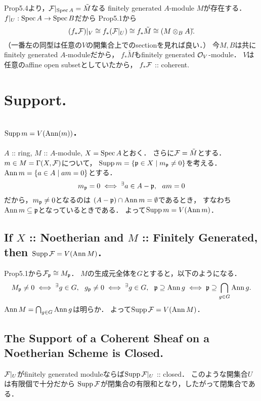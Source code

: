 \documentclass[a4paper]{jsarticle}
\begin{document}
    Prop5.4より，$\mathcal{F}|_{\operatorname{Spec} A}=\tilde{M}$なる
    finitely generated $A$-module $M$が存在する．
    $f|_{U}: \operatorname{Spec} A \to \operatorname{Spec} B$だから
    Prop5.1から
    \[ (f_* \mathcal{F})|_V \cong f_* (\mathcal{F}|_U) \cong f_* \tilde{M} \cong (M \otimes_{B} A) \check{}. \]
    （一番左の同型は任意の$V$の開集合上でのsectionを見れば良い．）
    今$M,B$は共にfinitely generated $A$-moduleだから，
    $f_* \tilde{M}$もfinitely generated $\mathcal{O}_V$-module．
    $V$は任意のaffine open subsetとしていたから，
    $f_* \mathcal{F}$ :: coherent.

\section{Support.} %
    \subsection{$\operatorname{Supp} m=V(\operatorname{Ann}(m))$.}
    $A$ :: ring, $M$ :: $A$-module, $X=\operatorname{Spec} A$とおく．
    さらに$\mathcal{F}=\tilde{M}$とする．
    $m \in M=\Gamma(X,\mathcal{F})$について，
    $\operatorname{Supp} m=\{ \mathfrak{p} \in X \mid m_{\mathfrak{p}} \neq 0 \}$を考える．
    $\operatorname{Ann} m=\{a \in A \mid am=0 \}$とする．
    \[ m_{\mathfrak{p}}=0 \iff {}^{\exists} a \in A-\mathfrak{p},~~ am=0 \]
    だから，$m_{\mathfrak{p}} \neq 0$となるのは
    $(A-\mathfrak{p}) \cap \operatorname{Ann} m=\emptyset$であるとき，
    すなわち$\operatorname{Ann} m \subseteq \mathfrak{p}$となっているときである．
    よって$\operatorname{Supp} m=V(\operatorname{Ann} m)$．

    \subsection{If $X$ :: Noetherian and $M$ :: Finitely Generated, then $\operatorname{Supp} \mathcal{F}=V(\operatorname{Ann} M)$.}
    Prop5.1から$\mathcal{F}_{\mathfrak{p}} \cong M_{\mathfrak{p}}$．
    $M$の生成元全体を$G$とすると，以下のようになる．
    \[
        M_{\mathfrak{p}} \neq 0
        \iff {}^{\exists} g \in G,~~ g_{\mathfrak{p}} \neq 0
        \iff {}^{\exists} g \in G,~~ \mathfrak{p} \supseteq \operatorname{Ann} g
        \iff \mathfrak{p} \supseteq \bigcap_{g \in G} \operatorname{Ann} g.
    \]
    $\operatorname{Ann} M=\bigcap_{g \in G} \operatorname{Ann} g$は明らか．
    よって$\operatorname{Supp} \mathcal{F}=V(\operatorname{Ann} M)$．

    \subsection{The Support of a Coherent Sheaf on a Noetherian Scheme is Closed.}
    $\mathcal{F}|_{U}$がfinitely generated moduleならば$\operatorname{Supp} \mathcal{F}|_{U}$ :: closed．
    このような開集合$U$は有限個で十分だから
    $\operatorname{Supp} \mathcal{F}$が閉集合の有限和となり，したがって閉集合である．
\end{document}
